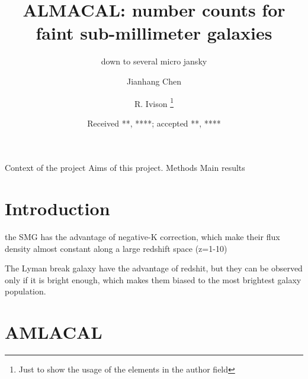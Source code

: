 \documentclass{ref/aa}
\begin{document}
 


   \title{ALMACAL: number counts for faint sub-millimeter galaxies}

   \subtitle{down to several micro jansky}

   \author{Jianhang Chen
          \and
          R. Ivison \fnmsep\thanks{Just to show the usage
          of the elements in the author field}
          }


   \date{Received **, ****; accepted **, ****}

 
  \abstract
   {Context of the project}
   {Aims of this project.}
   {Methods}
   {Main results}
   {}


   \maketitle
%

\section{Introduction}

the SMG has the advantage of negative-K correction, which make their flux density almost constant along a large redshift space (z=1-10)

The Lyman break galaxy have the advantage of redshit, but they can be observed only if it is bright enough, which makes them biased to the most brightest galaxy population.


\section{AMLACAL}
\end{document}

